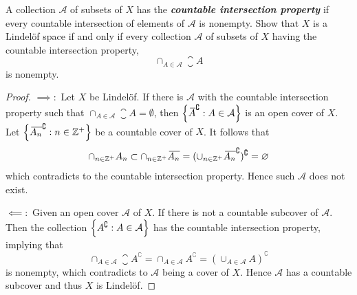 \documentclass[12pt,a4paper]{article}
\begin{document}
    \begin{ex}
        A collection $\mathcal{A}$ of subsets of $X$ has the \textbf{\textit{countable intersection property}} if every countable intersection of elements of $\mathcal{A}$ is nonempty. Show that $X$ is a Lindel\"of space if and only if every collection $\mathcal{A}$ of subsets of $X$ having the countable intersection property,
        $$
        \cap_{A\in\mathcal{A}}\closure{A}
        $$
        is nonempty.
    \end{ex}
    \begin{proof}
        $\implies:$ Let $X$ be Lindel\"of. If there is $\mathcal{A}$ with the countable intersection property such that $\cap_{A\in\mathcal{A}}\closure{A}=\emptyset$, then $\left\{{}\mkern3mu\overline{\mkern-3muA}^\complement:A\in\mathcal{A}\right\}$ is an open cover of $X$. Let $\left\{{}\mkern3mu\overline{\mkern-3muA_n}^\complement:n\in\mathbb{Z}^+\right\}$ be a countable cover of $X$. It follows that
        $$
        \cap_{n\in\mathbb{Z}^+}A_n\subset\cap_{n\in\mathbb{Z}^+}{}\mkern3mu\overline{\mkern-3muA_n}=(\cup_{n\in\mathbb{Z}^+}{}\mkern3mu\overline{\mkern-3muA_n}^\complement)^\complement=\varnothing
        $$
        which contradicts to the countable intersection property. Hence such $\mathcal{A}$ does not exist.
        
        $\impliedby:$ Given an open cover $\mathcal{A}$ of $X$. If there is not a countable subcover of $\mathcal{A}$. Then the collection $\left\{A^\complement:A\in\mathcal{A}\right\}$ has the countable intersection property, implying that
        $$
        \cap_{A\in\mathcal{A}}\closure{A^\complement}=\cap_{A\in\mathcal{A}}A^\complement=(\cup_{A\in\mathcal{A}}A)^\complement
        $$
        is nonempty, which contradicts to $\mathcal{A}$ being a cover of $X$. Hence $\mathcal{A}$ has a countable subcover and thus $X$ is Lindel\"of.
    \end{proof}
    \hfill
\end{document}
